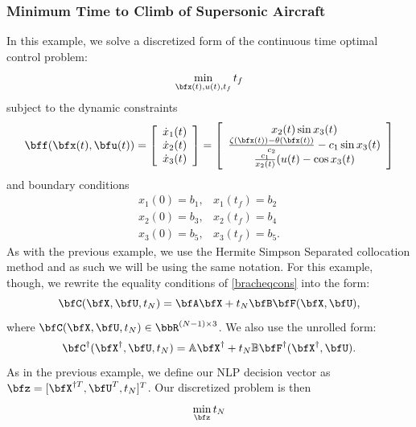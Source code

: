 \documentclass[10pt,pdftex]{article}
\begin{document}
\subsubsection{Minimum Time to Climb of Supersonic Aircraft}
In this example, we solve a discretized form of the continuous time optimal control problem:
\begin{equation}
\min\limits_{\bfx(t),u(t),t_f} t_f
\end{equation}
subject to the dynamic constraints
\begin{equation}
\bff(\bfx(t),\bfu(t)) = 
\left[ \begin{array}{c}
\dot{x}_1(t) \\ \dot{x}_2(t)\\ \dot{x}_3(t)
\end{array} \right] = 
\left[ \begin{array}{c}
x_2(t) \sin x_3(t)\\
\frac{\zeta(\bfx(t))-\theta(\bfx(t))}{c_2}-c_1\sin x_3(t)\\
\frac{c_1}{x_2(t)}(u(t) - \cos x_3(t)
\end{array} \right]
\end{equation}
and boundary conditions
\begin{equation}
\begin{array}{ll}
x_1(0) =  b_1, & x_1(t_f) =  b_2 \\
x_2(0) =  b_3, & x_2(t_f) =  b_4 \\
x_3(0) =  b_5, & x_3(t_f) =  b_5.
\end{array}
\end{equation}
As with the previous example, we use the Hermite Simpson Separated collocation method and as such we will be using the same notation. For this example, though, we rewrite the equality conditions of \ref{bracheqcons} into the form:
\begin{equation}
\bfC(\bfX,\bfU,t_N) = \bfA\bfX + t_N\bfB\bfF(\bfX,\bfU),
\end{equation}
where $\bfC(\bfX,\bfU,t_N) \in \bbR^{(N-1)\times 3}$. We also use the unrolled form:
\begin{equation}
\bfC^{\dag}(\bfX^{\dag},\bfU,t_N) = \mathbb{A}\bfX^{\dag} + t_N\mathbb{B}\bfF^{\dag}(\bfX^{\dag},\bfU).
\end{equation}
As in the previous example, we define our NLP decision vector as $\bfz = [\bfX^{\dag T},\bfU^T,t_N]^T$.
Our discretized problem is then
\begin{equation}
\min\limits_{\bfz} t_N
\end{equation}
\end{document}
